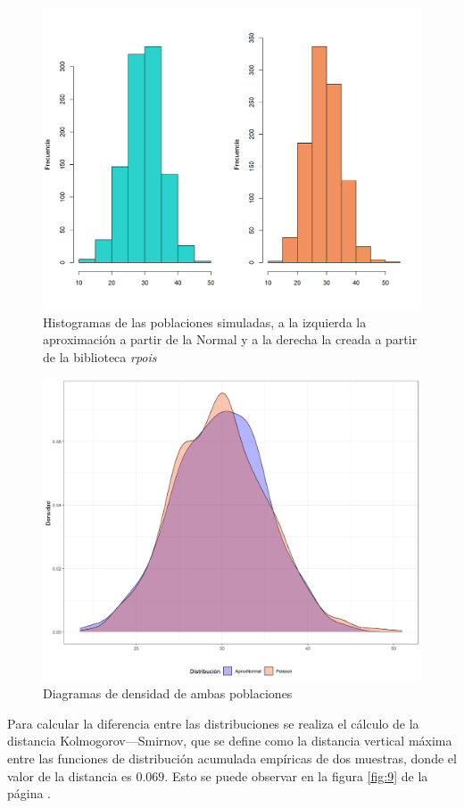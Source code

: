 \documentclass{article}
\begin{document}
\begin{center}
\begin{figure}
\includegraphics[scale=0.65]{figuras/AproxNr30.png}
\caption{Histogramas de las poblaciones simuladas, a la izquierda la aproximación a partir de la Normal y a la derecha la creada a partir de la biblioteca \textit{rpois}}
\label{fig:7}
\end{figure}
\end{center}

\begin{center}
\begin{figure}
\includegraphics[scale=0.6]{figuras/densidadPN.png}
\caption{Diagramas de densidad de ambas poblaciones}
\label{fig:8}
\end{figure}
\end{center}
Para calcular la diferencia entre las distribuciones se realiza el cálculo de la distancia Kolmogorov–--Smirnov, que se define como la distancia vertical máxima entre las funciones de distribución acumulada empíricas de dos muestras, donde el valor de la distancia es $0.069$. Esto se puede observar en la figura \ref{fig:9} de la página \pageref{fig:9}.
\end{document}
